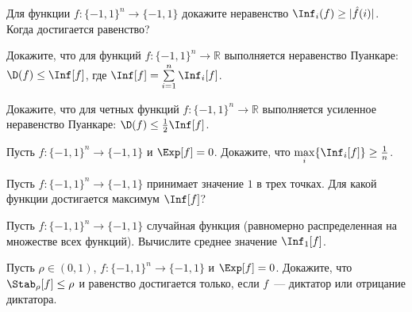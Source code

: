 \begin{task}
    Для функции $f: \{-1, 1\}^n \to \{-1, 1\}$ докажите неравенство $\Inf_i(f) \ge |\hat f(i)|$. Когда достигается равенство?
\end{task}

\begin{task}
    Докажите, что для функций $f: \{-1, 1\}^n \to \mathbb{R}$ выполняется неравенство Пуанкаре: $\D(f) \le \Inf[f]$, где $\Inf[f]
    = \sum\limits_{i = 1}^n \Inf_i[f]$.
\end{task}

\begin{task}
	Докажите, что для четных функций $f: \{-1, 1\}^n \to \mathbb{R}$ выполняется усиленное неравенство Пуанкаре: $\D(f) \le
    \frac{1}{2} \Inf[f]$.
\end{task}

\begin{task}
    Пусть $f: \{-1, 1\}^n \to \{-1, 1\}$ и $\Exp[f] = 0$. Докажите, что $\max\limits_i \{\Inf_i[f]\} \ge \frac{1}{n}$.
\end{task}

\begin{task}
	Пусть $f: \{-1, 1\}^n \to \{-1, 1\}$ принимает значение $1$ в трех точках. Для какой функции достигается максимум $\Inf[f]$?
\end{task}

\begin{task}
	Пусть $f: \{-1, 1\}^n \to \{-1, 1\}$ случайная функция (равномерно распределенная на множестве всех функций). Вычислите
    среднее значение $\Inf_1[f]$.
\end{task}

\begin{task}
    Пусть $\rho \in (0,1)$, $f: \{-1, 1\}^n \to \{-1, 1\}$ и $\Exp[f] = 0$. Докажите, что $\Stab_\rho[f] \le \rho$ и равенство
    достигается только, если $f$~--- диктатор или отрицание диктатора.
\end{task}


